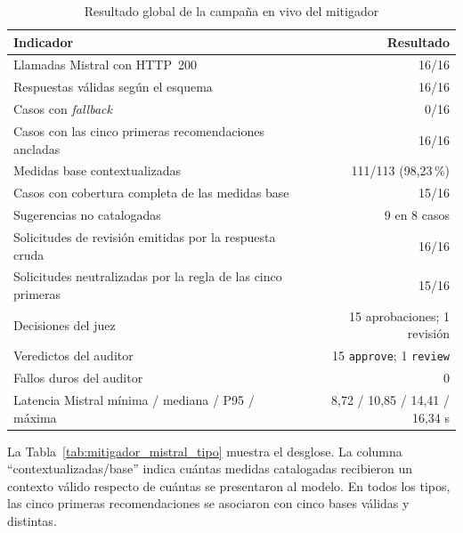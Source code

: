 \begin{table}[H]
    \ttabbox
    {\caption{Resultado global de la campaña en vivo del mitigador}
    \label{tab:mitigador_mistral_global}}
    {\begin{tabular}{P{8.0cm} r}
        \hline
        \textbf{Indicador} & \textbf{Resultado} \\
        \hline
        Llamadas Mistral con HTTP~200 & 16/16 \\
        \hline
        Respuestas válidas según el esquema & 16/16 \\
        \hline
        Casos con \textit{fallback} & 0/16 \\
        \hline
        Casos con las cinco primeras recomendaciones ancladas & 16/16 \\
        \hline
        Medidas base contextualizadas & 111/113 (98,23\,\%) \\
        \hline
        Casos con cobertura completa de las medidas base & 15/16 \\
        \hline
        Sugerencias no catalogadas & 9 en 8 casos \\
        \hline
        Solicitudes de revisión emitidas por la respuesta cruda & 16/16 \\
        \hline
        Solicitudes neutralizadas por la regla de las cinco primeras & 15/16 \\
        \hline
        Decisiones del juez & 15 aprobaciones; 1 revisión \\
        \hline
        Veredictos del auditor & 15 \texttt{approve}; 1 \texttt{review} \\
        \hline
        Fallos duros del auditor & 0 \\
        \hline
        Latencia Mistral mínima / mediana / P95 / máxima &
        8,72 / 10,85 / 14,41 / 16,34 s \\
        \hline
    \end{tabular}}
\end{table}

La Tabla~\ref{tab:mitigador_mistral_tipo} muestra el desglose. La columna
``contextualizadas/base'' indica cuántas medidas catalogadas recibieron un
contexto válido respecto de cuántas se presentaron al modelo. En todos los
tipos, las cinco primeras recomendaciones se asociaron con cinco bases válidas
y distintas.

